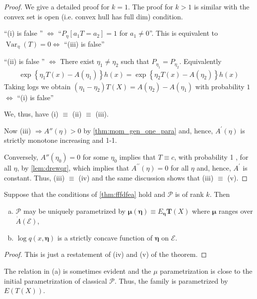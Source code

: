 \documentclass{article}
\begin{document}
\begin{proof}
 We give a detailed proof for $k=1$. The proof for $k>1$ is similar with the convex set is open (i.e. convex hull has full dim) condition.
 
``(i) is false '' $\Leftrightarrow$ ``$P_{\eta}\left[a_{1} T=a_{2}\right]=1$ for $a_{1} \neq 0$''. This is equivalent to $\operatorname{Var}_{\eta}(T)=0 \Leftrightarrow$ ``(iii) is false''

``(ii) is false '' $\Leftrightarrow$ There exist $\eta_{1} \neq \eta_{2}$ such that $P_{\eta_{1}}=P_{\eta_{2}} .$
Equivalently
\begin{align*}
\exp \left\{\eta_{1} T(x)-A\left(\eta_{1}\right)\right\} h(x)=\exp \left\{\eta_{2} T(x)-A\left(\eta_{2}\right)\right\} h(x)
\end{align*}
Taking logs we obtain $\left(\eta_{1}-\eta_{2}\right) T(X)=A\left(\eta_{2}\right)-A\left(\eta_{1}\right)$ with probability $1$ $\Leftrightarrow$ ``(i) is false''

We, thus, have (i) $\equiv$ (ii) $\equiv$ (iii). 

Now (iii) $\Rightarrow A''(\eta)>0$ by \cref{thm:mom_gen_one_para} and, hence, $A^{\prime}(\eta)$ is strictly monotone increasing and 1-1. 

Conversely, $A''\left(\eta_{0}\right)=0$ for some $\eta_{0}$ implies that $T \equiv c$, with probability 1 , for all $\eta$, by \cref{lem:drewqr}, which implies that $A^{\prime \prime}(\eta)=0$ for all $\eta$ and, hence, $A^{\prime}$ is constant. Thus, (iii) $\equiv$ (iv) and the same discussion shows that (iii) $\equiv$ (v).
\end{proof}
\begin{cora}
Suppose that the conditions of \cref{thm:fffdfea} hold and $\mathcal{P}$ is of rank $k$. Then
\begin{enumerate}[(a).]
    \item $\mathcal{P}$ may be uniquely parametrized by $\boldsymbol{\mu}(\boldsymbol{\eta}) \equiv E_{\boldsymbol{\eta}} \mathbf{T}(X)$ where $\boldsymbol{\mu}$ ranges over $\dot{A}(\mathcal{E})$,
    \item $\log q(x, \boldsymbol{\eta})$ is a strictly concave function of $\boldsymbol{\eta}$ on $\mathcal{E}$.
\end{enumerate}
\end{cora}
\begin{proof}
 This is just a restatement of (iv) and (v) of the theorem.
\end{proof} 
\begin{rema}
The relation in (a) is sometimes evident and the $\mu$ parametrization is close to the initial parametrization of classical $\mathcal{P}$. Thus, the  family is parametrized by $E(T(X))$.
\end{rema}
\end{document}
